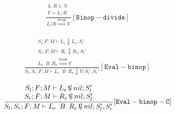 \documentclass{scrartcl}
\DeclareMathOperator{\numtype}{\mathbb{R}}
\DeclareMathOperator{\ceval}{\overset{C}{\smash{\Downarrow}}}
\begin{document}
    \begin{align*}
    \frac{
        \begin{matrix}
        L, R \in \numtype \\
        V = L / R
        \end{matrix}
    }{
        L / R \overset{binop}{\Rightarrow} V
    }[\mathtt{Binop-divide}]
    \end{align*}
    
    \begin{align*}
    \frac{
        \begin{matrix}
        S_l; F; M \vdash L_e \Downarrow L_v; S_l' \\
        S_r; F; M \vdash R_e \Downarrow R_v; S_l' \\
        L_v \enspace B \enspace R_v \overset{binop}{\Rightarrow} V
        \end{matrix}
    }{
        S_l, S_r; F; M \vdash L_e \enspace B \enspace R_e \Downarrow V; S_l', S_r'
    }[\mathtt{Eval-binop}]
    \end{align*}
    
    \begin{align*}
    \frac{
        \begin{matrix}
        S_l; F; M \vdash L_e  \ceval nil; S_l' \\
        S_r; F; M \vdash R_e  \ceval nil; S_l' \\
        \end{matrix}
    }{
        S_l, S_r; F; M \vdash L_e \enspace B \enspace R_e  \ceval nil; S_l', S_r'
    }[\mathtt{Eval-binop-C}]
    \end{align*}
    
\end{document}
